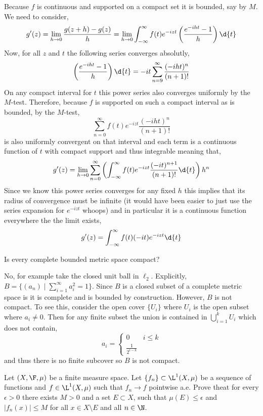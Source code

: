 \documentclass[12pt]{article}
\begin{document}
Because $f$ is continuous and supported on a compact set it is bounded, say by $M$. We need to consider,
\[ g'(z) = \lim_{h \to 0} \frac{g(z + h) - g(z)}{h} = \lim_{h \to 0} \int_{-\infty}^{\infty} f(t) e^{- i z t} \left( \frac{e^{-i h t} - 1}{h} \right) \d{t} \]
Now, for all $z$ and $t$ the following series converges absolutly,
\[ \left( \frac{e^{-i h t} - 1}{h} \right) \d{t} = -i t \sum_{n = 9}^{\infty} \frac{(-ih t)^n}{(n+1)!} \]
On any compact interval for $t$ this power series also converges uniformly by the $M$-test. Therefore, because $f$ is supported on such a compact interval as is bounded, by the $M$-test,
\[ \sum_{n = 0}^\infty f(t) e^{- i z t} \frac{(- i h t)^n}{(n + 1)!} \]
is also uniformly convergent on that interval and each term is a continuous function of $t$ with compact support and thus integrable meaning that,
\[ g'(z) = \lim_{h \to 0} \sum_{n = 0}^{\infty} \left( \int_{-\infty}^{\infty} f(t) e^{- i z t} \frac{(- i t)^{n+1}}{(n + 1)!} \d{t} \right) h^n \]
Since we know this power series converges for any fixed $h$ this implies that its radius of convergence must be infinite (it would have been easier to just use the series expansion for $e^{-i z t}$ whoops) and in particular it is a continuous function everywhere the the limit exists,
\[ g'(z) = \int_{-\infty}^{\infty} f(t) (-i t) e^{-i z t} \d{t} \]

\begin{exercise}
Is every complete bounded metric space compact?
\end{exercise}

No, for example take the closed unit ball in $\ell_2$. Explicitly, $B = \{ (a_n) \mid \sum_{i = 1}^\infty a_i^2 = 1 \}$. Since $B$ is a closed subset of a complete metric space is it is complete and is bounded by construction. However, $B$ is not compact. To see this, consider the open cover $\{ U_i \}$ where $U_i$ is the open subset where $a_i \neq 0$. Then for any finite subset the union is contained in $\bigcup_{i = 1}^k U_i$ which does not contain,
\[ a_i = 
\begin{cases}
0 & i \le k 
\\
\tfrac{1}{2^{i - k}}
\end{cases} \]
and thus there is no finite subcover so $B$ is not compact.

\begin{exercise}
Let $(X, \F, \mu)$ be a finite measure space. Let $\{ f_n \} \subset \L^1(X, \mu)$ be a sequence of functions and $f \in \L^1(X, \mu)$ such that $f_n \to f$ pointwise a.e. Prove theat for every $\epsilon > 0$ there exists $M > 0$ and a set $E \subset X$, such that $\mu(E) \le \epsilon$ and $|f_n(x)| \le M$ for all $x \in X \setminus E$ and all $n \in \N$.
\end{exercise}
\end{document}
